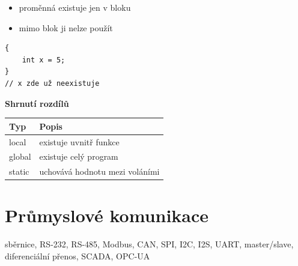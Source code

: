 \documentclass[a4paper,10pt]{article}
\begin{document}
\begin{vysvetlenibox}
\begin{itemize}
\item proměnná existuje jen v bloku { }
\item mimo blok ji nelze použít
\end{itemize}

\begin{vzorcebox}
\begin{verbatim}
{
    int x = 5;
}
// x zde už neexistuje
\end{verbatim}
\end{vzorcebox}

\textbf{Shrnutí rozdílů}

\begin{tabularx}{\linewidth}{l X}
\toprule
\textbf{Typ} & \textbf{Popis} \\
\midrule
local & existuje uvnitř funkce \\
global & existuje celý program \\
static & uchovává hodnotu mezi voláními \\
\bottomrule
\end{tabularx}

\end{vysvetlenibox}



\newpage


\section{Průmyslové komunikace}

\begin{pojmybox}
sběrnice, RS-232, RS-485, Modbus, CAN,
SPI, I2C, I2S, UART,
master/slave, diferenciální přenos,
SCADA, OPC-UA
\end{pojmybox}
\end{document}
